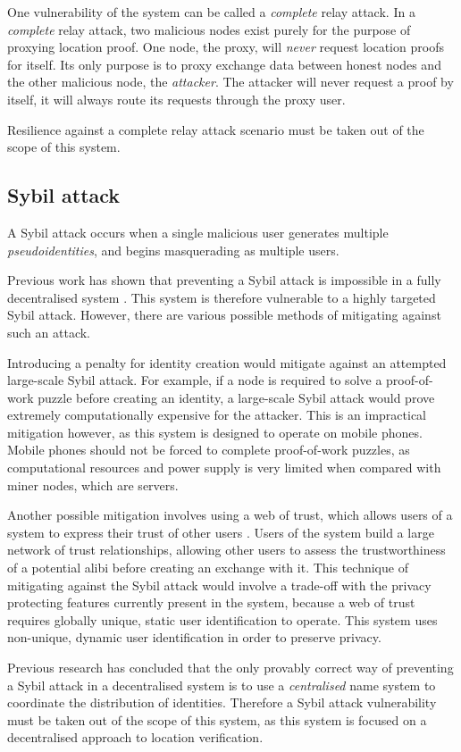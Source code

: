 One vulnerability of the system can be called a \textit{complete} relay attack. In a \textit{complete} relay attack, two malicious nodes exist purely for the purpose of proxying location proof. One node, the proxy, will \textit{never} request location proofs for itself. Its only purpose is to proxy exchange data between honest nodes and the other malicious node, the \textit{attacker}. The attacker will never request a proof by itself, it will always route its requests through the proxy user.

Resilience against a complete relay attack scenario must be taken out of the scope of this system. 

\subsection{Sybil attack}
A Sybil attack occurs when a single malicious user generates multiple \textit{pseudoidentities}, and begins masquerading as multiple users.

Previous work has shown that preventing a Sybil attack is impossible in a fully decentralised system \cite{sybil}. This system is therefore vulnerable to a highly targeted Sybil attack. However, there are various possible methods of mitigating against such an attack.

Introducing a penalty for identity creation would mitigate against an attempted large-scale Sybil attack. For example, if a node is required to solve a proof-of-work puzzle before creating an identity, a large-scale Sybil attack would prove extremely computationally expensive for the attacker. This is an impractical mitigation however, as this system is designed to operate on mobile phones. Mobile phones should not be forced to complete proof-of-work puzzles, as computational resources and power supply is very limited when compared with miner nodes, which are servers.

Another possible mitigation involves using a web of trust, which  allows users of a system to express their trust of other users \cite{weboftrust}. Users of the system build a large network of trust relationships, allowing other users to assess the trustworthiness of a potential alibi before creating an exchange with it. This technique of mitigating against the Sybil attack would involve a trade-off with the privacy protecting features currently present in the system, because a web of trust requires globally unique, static user identification to operate. This system uses non-unique, dynamic user identification in order to preserve privacy.

Previous research \cite{sybil} has concluded that the only provably correct way of preventing a Sybil attack in a decentralised system is to use a \textit{centralised} name system to coordinate the distribution of identities. Therefore a Sybil attack vulnerability must be taken out of the scope of this system, as this system is focused on a decentralised approach to location verification.